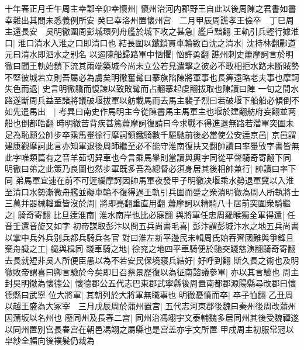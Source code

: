 十年春正月壬午周主幸鄴辛卯幸懷州|{
	懷州治河内郡野王自此以後周陳之君書如書幸雜出其間未悉義例所安}
癸巳幸洛州置懷州宫　二月甲辰周譙孝王儉卒　丁巳周主還長安　吳明徹圍周彭城環列舟艦於城下攻之甚急|{
	艦戶黯翻}
王軌引兵輕行據淮口|{
	淮口清水入淮之口即清口也}
結長圍以鐵鎻貫車輪數百沈之清水|{
	沈持林翻酈道元曰清水即泗水之别名}
以遏陳船歸路軍中忷懼|{
	忷許勇翻}
譙州刺史蕭摩訶言於明徹曰聞王軌始鎖下流其兩端築城今尚未立公若見遣擊之彼必不敢相拒水路未斷賊勢不堅彼城若立則吾屬必為虜矣明徹奮髯曰搴旗陷陳將軍事也長筭遠略老夫事也摩訶失色而退|{
	史言明徹驕而愎諫以致敗髯而占翻搴起䖍翻拔取也陳讀曰陣}
一旬之間水路遂斷周兵益至諸將議破堰拔軍以舫載馬而去馬主裴子烈曰若破堰下船船必傾倒不如先遣馬出　|{
	考異曰南史作馬明主今從陳書馬主馬軍主也堰於建翻舫府妄翻並两船也倒都皓翻}
時明徹苦背疾甚篤蕭摩訶復請曰今求戰不得進退無路若濳軍突圍未足為恥願公帥步卒乘馬轝徐行摩訶領鐵騎數千驅馳前後必當使公安逹京邑|{
	京邑謂建康觀摩訶此言亦知軍退後周師繼至必不能守淮南復扶又翻帥讀曰率轝攷字書皆無此字唯類篇有之音羊茹切舁車也今言乘馬轝則當讀與輿字同從平聲騎奇寄翻下同}
明徹曰弟之此策乃良圖也然步軍既多吾為總督必須身居其後相帥兼行|{
	帥讀曰率下同}
弟馬軍宜速在前不可遲緩摩訶因帥馬軍夜發甲子明徹决堰乘水勢退軍冀以入淮至清口水勢漸微舟艦並礙車輪不復得過王軌引兵圍而蹙之衆潰明徹為周人所執將士三萬并器械輜重皆沒於周|{
	將即亮翻重直用翻}
蕭摩訶以精騎八十居前突圍衆騎繼之|{
	騎奇寄翻}
比旦逹淮南|{
	淮水南岸也比必寐翻}
與將軍任忠周羅㬋獨全軍得還|{
	任音壬還音旋又如字}
初帝謀取彭汴以問五兵尚書毛喜|{
	彭汴謂彭城汴水之地五兵尚書以掌中兵外兵别兵都兵騎兵各官}
對曰淮左新平邊民未輯周氏始吞齊國難與爭鋒且棄舟艥之工|{
	艥與楫同}
踐車騎之地|{
	徐兖之地四平車騎便於馳突踐慈演翻騎奇寄翻}
去長就短非吳人所便臣愚以為不若安民保境寢兵結好|{
	好呼到翻}
斯久長之術也及明徹敗帝謂喜曰卿言驗於今矣即日召蔡景歷復以為征南諮議參軍|{
	亦以其言驗也}
周主封吳明徹為懷德公|{
	懷德郡公五代志巴東郡武寧縣後周置南都郡源陽縣尋改郡曰懷德縣曰武寧}
位大將軍|{
	其朝列於大將軍無職事也}
明徹憂憤而卒|{
	卒子恤翻}
乙丑周以越王盛為大冢宰　三月戊辰周於蒲州置宫|{
	五代志河東郡後魏曰秦州後周改蒲州因蒲坂以名州也}
廢同州及長春二宫|{
	同州治馮翊宇文泰輔魏多居同州其後受魏禪遂以同州置别宫長春宫在朝邑馮翊之屬縣也是宫盖亦宇文所置}
甲戍周主初服常冠以皁紗全幅向後襆髪仍裁為

